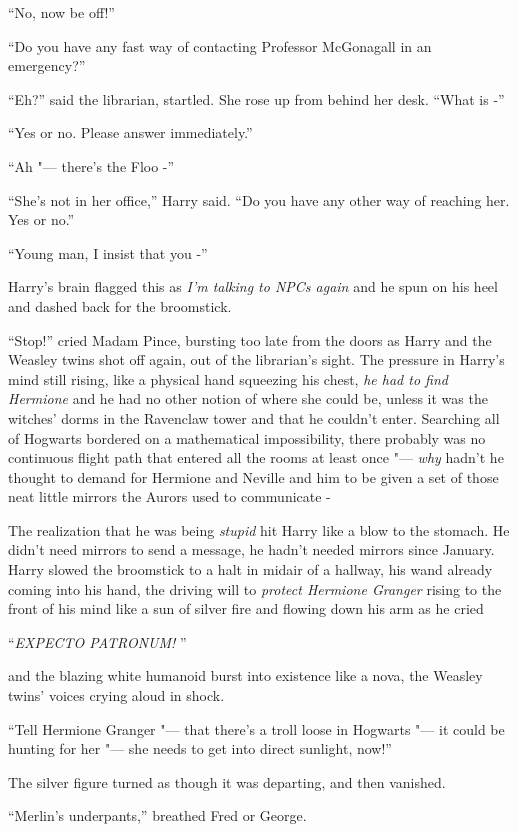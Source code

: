 ``No, now be off!''

``Do you have any fast way of contacting Professor McGonagall in an
emergency?''

``Eh?'' said the librarian, startled. She rose up from behind her desk.
``What is -''

``Yes or no. Please answer immediately.''

``Ah "--- there's the Floo -''

``She's not in her office,'' Harry said. ``Do you have any other way of
reaching her. Yes or no.''

``Young man, I insist that you -''

Harry's brain flagged this as \emph{I'm talking to NPCs again} and he
spun on his heel and dashed back for the broomstick.

``Stop!'' cried Madam Pince, bursting too late from the doors as Harry
and the Weasley twins shot off again, out of the librarian's sight. The
pressure in Harry's mind still rising, like a physical hand squeezing
his chest, \emph{he had to find Hermione} and he had no other notion of
where she could be, unless it was the witches' dorms in the Ravenclaw
tower and that he couldn't enter. Searching all of Hogwarts bordered on
a mathematical impossibility, there probably was no continuous flight
path that entered all the rooms at least once "--- \emph{why} hadn't he
thought to demand for Hermione and Neville and him to be given a set of
those neat little mirrors the Aurors used to communicate -

The realization that he was being \emph{stupid} hit Harry like a blow to
the stomach. He didn't need mirrors to send a message, he hadn't needed
mirrors since January. Harry slowed the broomstick to a halt in midair
of a hallway, his wand already coming into his hand, the driving will to
\emph{protect Hermione Granger} rising to the front of his mind like a
sun of silver fire and flowing down his arm as he cried

``\emph{EXPECTO PATRONUM!} ''

and the blazing white humanoid burst into existence like a nova, the
Weasley twins' voices crying aloud in shock.

``Tell Hermione Granger "--- that there's a troll loose in Hogwarts "--- it
could be hunting for her "--- she needs to get into direct sunlight, now!''

The silver figure turned as though it was departing, and then vanished.

``Merlin's underpants,'' breathed Fred or George.

